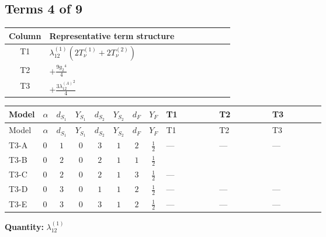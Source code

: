 \documentclass[8pt]{article}
\begin{document}
\begin{landscape}
\subsection*{Terms 4 of 9}
\begin{center}
\begin{tabular}{@{}c >{\raggedright\arraybackslash}p{0.82\linewidth}@{}}
\toprule
Column & Representative term structure \\
\midrule
T1 & \(\displaystyle {\lambda_{12}^{(1)}} (2 T_{\nu}^{(1)}+2 T_{\nu}^{(2)})\) \\
\midrule
T2 & \(\displaystyle +\frac{9 {g_2}^4}{4}\) \\
\midrule
T3 & \(\displaystyle +\frac{3 {\lambda_{12}^{(A)}}^2}{4}\) \\
\midrule
\bottomrule
\end{tabular}
\end{center}
\smallskip
\tiny
\begin{longtable}{@{}llcccccc >{\raggedright\arraybackslash}p{0.21\linewidth} >{\raggedright\arraybackslash}p{0.21\linewidth} >{\raggedright\arraybackslash}p{0.21\linewidth}@{}}
\toprule
Model & $\alpha$ & $d_{S_1}$ & $Y_{S_1}$ & $d_{S_2}$ & $Y_{S_2}$ & $d_F$ & $Y_F$ & T1 & T2 & T3 \\
\midrule
\endfirsthead
\toprule
Model & $\alpha$ & $d_{S_1}$ & $Y_{S_1}$ & $d_{S_2}$ & $Y_{S_2}$ & $d_F$ & $Y_F$ & T1 & T2 & T3 \\
\midrule
\endhead
T3-A & $0$ & $1$ & $0$ & $3$ & $1$ & $2$ & $\frac{1}{2}$ & --- & --- & --- \\
\midrule
T3-B & $0$ & $2$ & $0$ & $2$ & $1$ & $1$ & $\frac{1}{2}$ & \scriptsize\adjustbox{max width=\linewidth}{$\begin{gathered} {\lambda_{12}^{(1)}} (2 T_{\nu}^{(1)}+2 T_{\nu}^{(2)})\end{gathered}$} & \scriptsize\adjustbox{max width=\linewidth}{$\begin{gathered} +\frac{9 {g_2}^4}{4}\end{gathered}$} & \scriptsize\adjustbox{max width=\linewidth}{$\begin{gathered} +\frac{3 {\lambda_{12}^{(A)}}^2}{4}\end{gathered}$} \\
\midrule
T3-C & $0$ & $2$ & $0$ & $2$ & $1$ & $3$ & $\frac{1}{2}$ & --- & \scriptsize\adjustbox{max width=\linewidth}{$\begin{gathered} +\frac{9 {g_2}^4}{4}\end{gathered}$} & \scriptsize\adjustbox{max width=\linewidth}{$\begin{gathered} +\frac{3 {\lambda_{12}^{(A)}}^2}{4}\end{gathered}$} \\
\midrule
T3-D & $0$ & $3$ & $0$ & $1$ & $1$ & $2$ & $\frac{1}{2}$ & --- & --- & --- \\
\midrule
T3-E & $0$ & $3$ & $0$ & $3$ & $1$ & $2$ & $\frac{1}{2}$ & --- & --- & --- \\
\midrule
\bottomrule
\end{longtable}
\clearpage
\noindent\textbf{Quantity: }$\lambda_{12}^{(1)}$\par\smallskip

\end{landscape}
\end{document}
